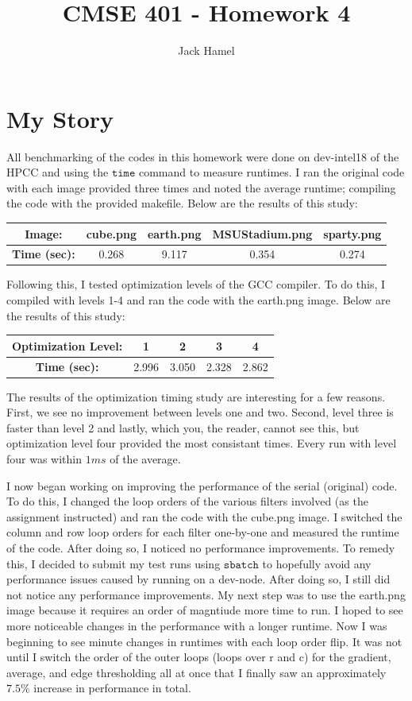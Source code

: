 \documentclass[letterpaper,11pt]{article}
\title{CMSE 401 - Homework 4}
\author{Jack Hamel}
\begin{document}
\maketitle

\section{My Story}

All benchmarking of the codes in this homework were done on dev-intel18 of the HPCC and using the $\texttt{time}$ command to measure runtimes.  I ran the original code with each image provided three times and noted the average runtime; compiling the code with the provided makefile.  Below are the results of this study:
\begin{center}
 \begin{tabular}{|c| c c c c|}
 \hline
 \textbf{Image:} & cube.png & earth.png & MSUStadium.png & sparty.png \\[1.5ex]
 \hline
 \textbf{Time (sec):} & 0.268 & 9.117 & 0.354 & 0.274 \\
 \hline
\end{tabular}
\end{center}
Following this, I tested optimization levels of the GCC compiler.  To do this, I compiled with levels 1-4 and ran the code with the earth.png image.  Below are the results of this study:
\begin{center}
 \begin{tabular}{|c| c c c c|}
 \hline
 \textbf{Optimization Level:} & 1 & 2 & 3 & 4 \\[1.5ex]
 \hline
 \textbf{Time (sec):} & 2.996 & 3.050 & 2.328 & 2.862 \\
 \hline
\end{tabular}
\end{center}
The results of the optimization timing study are interesting for a few reasons.  First, we see no improvement between levels one and two.  Second, level three is faster than level 2 and lastly, which you, the reader, cannot see this, but optimization level four provided the most consistant times.  Every run with level four was within $1ms$ of the average.  

I now began working on improving the performance of the serial (original) code.  To do this, I changed the loop orders of the various filters involved (as the assignment instructed) and ran the code with the cube.png image.  I switched the column and row loop orders for each filter one-by-one and measured the runtime of the code.  After doing so, I noticed no performance improvements.  To remedy this, I decided to submit my test runs using $\texttt{sbatch}$ to hopefully avoid any performance issues caused by running on a dev-node.  After doing so, I still did not notice any performance improvements.  My next step was to use the earth.png image because it requires an order of magntiude more time to run.  I hoped to see more noticeable changes in the performance with a longer runtime.  Now I was beginning to see minute changes in runtimes with each loop order flip.  It was not until I switch the order of the outer loops (loops over r and c) for the gradient, average, and edge thresholding all at once that I finally saw an approximately $7.5\%$ increase in performance in total.  
\end{document}
